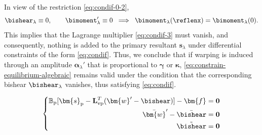 In view of the restriction \eqref{eq:condif-0-2}, 
\[
  \bishear_{\lambda} \equiv 0,\qquad \bimoment_{\lambda}' \equiv 0 \;\implies\; \bimoment_{\lambda}(\reflenx)=\bimoment_{\lambda}(0).
\]
This implies that the Lagrange multiplier \eqref{eq:condif-3} must vanish, and consequently, nothing is added to the primary resultant \(\bm{s}_{\lambda}\) under differential constraints of the form \eqref{eq:condif}. 
Thus, we conclude that if warping is induced through an amplitude \(\bm{\alpha}_{\lambda}'\) that is proportional to \(\bm\gamma\) or \(\bm\kappa\), \eqref{eq:constrain-equilibrium-algebraic} remains valid under the condition that the corresponding bishear \(\bishear_{\lambda}\) vanishes, thus satisfying \eqref{eq:condif}.

\begin{equation}
\left\{
\begin{aligned}
\mathbb{B}_{\rm p}[{\bm{s}}_{\rm p} - \mathbf{L}^T_{\rm vp}(\bm{w}'-\bishear)] - \bm{f} &=\mathbf{0} \\
\bar{\bm{w}}' - \bar{\bishear} &= \mathbf{0} \\
\tilde{\bishear}&=\mathbf{0}
\end{aligned}
\right.
\label{eq:constrain-equilibrium-differential}
\end{equation}



